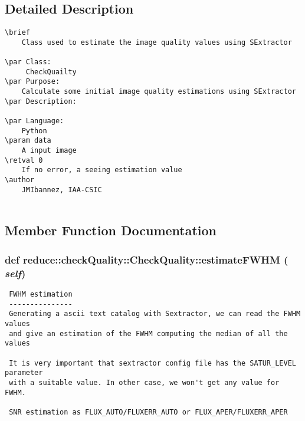 \subsection{Detailed Description}


\footnotesize\begin{verbatim}
\brief 
    Class used to estimate the image quality values using SExtractor 

\par Class:
     CheckQuailty   
\par Purpose:
    Calculate some initial image quality estimations using SExtractor
\par Description:
        
\par Language:
    Python
\param data
    A input image
\retval 0
    If no error, a seeing estimation value
\author
    JMIbannez, IAA-CSIC
    
\end{verbatim}
\normalsize
 



\subsection{Member Function Documentation}
\subsubsection{\setlength{\rightskip}{0pt plus 5cm}def reduce::check\-Quality::Check\-Quality::estimate\-FWHM ( {\em self})}\label{classreduce_1_1checkQuality_1_1CheckQuality_28bbc21856676dc01daa97c267c39a9d}




\footnotesize\begin{verbatim}
 FWHM estimation
 --------------- 
 Generating a ascii text catalog with Sextractor, we can read the FWHM values 
 and give an estimation of the FWHM computing the median of all the values

 It is very important that sextractor config file has the SATUR_LEVEL parameter
 with a suitable value. In other case, we won't get any value for FWHM. 

 SNR estimation as FLUX_AUTO/FLUXERR_AUTO or FLUX_APER/FLUXERR_APER
\end{verbatim}
\normalsize
